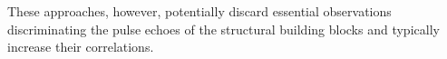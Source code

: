 These approaches, however, potentially discard
essential observations discriminating
the pulse echoes of
the structural building blocks and typically increase
their correlations.

